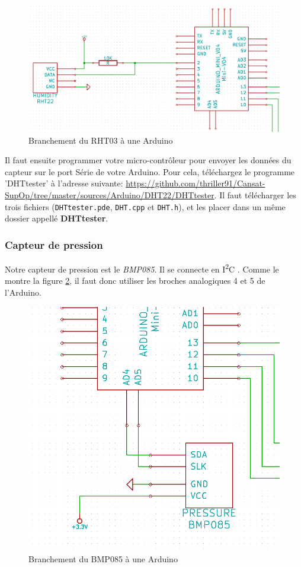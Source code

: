 \documentclass[twocolumn, 8pt]{article}
\newcommand\IdC{I\textsuperscript{2}C }
\begin{document}
\begin{figure}[!h]
	\centering
	\includegraphics[scale=.2]{RHT03.png}
	\caption{Branchement du RHT03 à une Arduino}
	\label{RHT03}
\end{figure}

\par Il faut ensuite programmer votre micro-contrôleur pour envoyer les données du capteur sur le port Série de votre Arduino. Pour cela, téléchargez le programme \textsf{'DHTtester'} à l'adresse suivante: \url{https://github.com/thriller91/Cansat-SupOp/tree/master/sources/Arduino/DHT22/DHTtester}. Il faut télécharger les trois fichiers (\texttt{DHTtester.pde}, \texttt{DHT.cpp} et \texttt{DHT.h}), et les placer dans un même dossier appellé \textbf{DHTtester}.

\subsubsection{Capteur de pression}
\par Notre capteur de pression est le \emph{BMP085}. Il se connecte en \IdC. Comme le montre la figure \ref{BMP085}, il faut donc utiliser les broches analogiques \no{}4 et 5 de l'Arduino.

\begin{figure}[!h]
	\centering
	\includegraphics[scale=.2]{BMP085.png}
	\caption{Branchement du BMP085 à une Arduino}
	\label{BMP085}
\end{figure}
\end{document}
